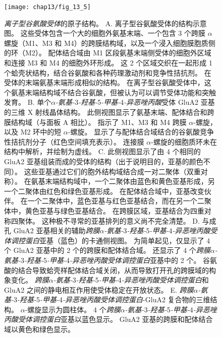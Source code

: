 \begin{figure}[htbp]
	\centering
	\texttt{[image: chap13/fig\_13\_5]}
	\caption{\textit{离子型谷氨酸受体}的原子结构。
		A. 离子型谷氨酸受体的结构示意图。 
		这些受体包含一个大的细胞外氨基末端、一个包含 3 个跨膜 $\alpha$螺旋（M1、M3 和 M4）的跨膜结构域，以及一个浸入细胞膜胞质侧的环（M2）。
		配体结合域由 M1 区段氨基末端侧受体的细胞外区域和连接 M3 和 M4 的细胞外环形成。
		这 2 个区域交织在一起形成 1 个蛤壳状结构，结合谷氨酸和各种药理激动剂和竞争性拮抗剂。
		在受体的末端氨基末端形成相似的结构。
		在离子型谷氨酸受体中，这个氨基末端结构域不结合谷氨酸，但被认为可以调节受体功能和突触发育\cite{armstrong1998structure}。
		B. 单个\textit{$\alpha$-氨基-}3\textit{-羟基-}5\textit{-甲基-}4\textit{-异恶唑丙酸}受体 GluA2 亚基的三维 X 射线晶体结构。
		此侧视图显示了氨基末端、配体结合和跨膜结构域（与面板 A 相比）。
		指示了 M1、M3 和 M4 跨膜 $\alpha$-螺旋，以及 M2 环中的短 $\alpha$-螺旋。
		显示了与配体结合域结合的谷氨酸竞争性拮抗剂分子（红色空间填充表示）。
		连接膜 $\alpha$-螺旋的细胞质环未在结构中解析，并绘制为虚线\cite{sobolevsky2009x}。
		C. 此侧视图显示了由 4 个相同的 GluA2 亚基组装而成的受体的结构（出于说明目的，亚基的颜色不同）。
		这些亚基通过它们的胞外结构域结合成一对二聚体（双重对称）。
		在氨基末端结构域中，一个二聚体由蓝色和黄色亚基形成，另一个二聚体由红色和绿色亚基形成。
		在配体结合域中，亚基改变伙伴。
		在一个二聚体中，蓝色亚基与红色亚基结合，而在另一个二聚体中，黄色亚基与绿色亚基结合。
		在跨膜区域，亚基结合为四重对称四聚体。
		这种极不寻常的亚基排列的意义尚不完全清楚\cite{sobolevsky2009x}。
		D. 与成孔 GluA2 亚基相关的辅助\textit{跨膜$\alpha$-氨基-}3\textit{-羟基-}5\textit{-甲基-}4\textit{-异恶唑丙酸受体调控蛋白}亚基（蓝色）的卡通侧视图。
		为简单起见，仅显示了 4 个 GluA2 亚基中的 2 个的跨膜和配体结合域。
		还显示了 4 个\textit{跨膜$\alpha$-氨基-}3\textit{-羟基-}5\textit{-甲基-}4\textit{-异恶唑丙酸受体调控蛋白}亚基中的 2 个。
		谷氨酸的结合导致蛤壳样配体结合域关闭，从而导致打开孔的跨膜域的构象变化。
		\textit{跨膜$\alpha$-氨基-}3\textit{-羟基-}5\textit{-甲基-}4\textit{-异恶唑丙酸受体调控蛋白}和 GluA2 之间的静电相互作用使受体稳定在开放状态\cite{mayer2016structural}。 
		E. \textit{跨膜$\alpha$-氨基-}3\textit{-羟基-}5\textit{-甲基-}4\textit{-异恶唑丙酸受体调控蛋白}-GluA2 复合物的三维结构。
		$\alpha$-螺旋显示为圆柱体。
		4 个\textit{跨膜$\alpha$-氨基-}3\textit{-羟基-}5\textit{-甲基-}4\textit{-异恶唑丙酸受体调控蛋白}亚基以蓝色显示。
		GluA2 亚基的跨膜和配体结合域以黄色和绿色显示\cite{mayer2016structural}。}
	\label{fig:13_5}
\end{figure}


